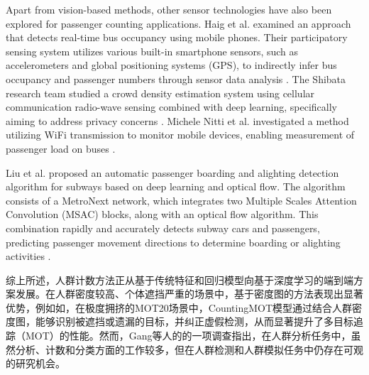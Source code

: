Apart from vision-based methods, other sensor technologies have also been explored for passenger counting applications. Haig et al. examined an approach that detects real-time bus occupancy using mobile phones. Their participatory sensing system utilizes various built-in smartphone sensors, such as accelerometers and global positioning systems (GPS), to indirectly infer bus occupancy and passenger numbers through sensor data analysis \cite{18_haig_real-time_2021}. The Shibata research team studied a crowd density estimation system using cellular communication radio-wave sensing combined with deep learning, specifically aiming to address privacy concerns \cite{52_shibata_people_2019}. Michele Nitti et al. investigated a method utilizing WiFi transmission to monitor mobile devices, enabling measurement of passenger load on buses \cite{70_noauthor_iabacus_nodate}.

Liu et al. proposed an automatic passenger boarding and alighting detection algorithm for subways based on deep learning and optical flow. The algorithm consists of a MetroNext network, which integrates two Multiple Scales Attention Convolution (MSAC) blocks, along with an optical flow algorithm. This combination rapidly and accurately detects subway cars and passengers, predicting passenger movement directions to determine boarding or alighting activities \cite{38_liu_automatic_2021}.


综上所述，人群计数方法正从基于传统特征和回归模型向基于深度学习的端到端方案发展\cite{13_dogra_survey_2024}。在人群密度较高、个体遮挡严重的场景中，基于密度图的方法表现出显著优势\cite{17_gupta_crowd_2024}，例如如，在极度拥挤的MOT20场景中，CountingMOT模型通过结合人群密度图，能够识别被遮挡或遗漏的目标，并纠正虚假检测，从而显著提升了多目标追踪（MOT）的性能\cite{125}。然而，Gang等人的的一项调查指出，在人群分析任务中，虽然分析、计数和分类方面的工作较多，但在人群检测和人群模拟任务中仍存在可观的研究机会\cite{01_noauthor_deep_2024}。

